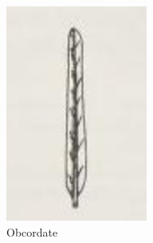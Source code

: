 \documentclass[12pt,english]{article}
\begin{document}
\begin{figure}[!hbt]
\begin{centre}
\begin{minipage}{0.19\textwidth}
		\includegraphics[width=\textwidth]{../code/contour/original/linear}
	\end{minipage}
	\begin{minipage}{0.19\textwidth}
		\caption{Obcordate}

\end{minipage}
\end{centre}
\end{figure}
\end{document}
